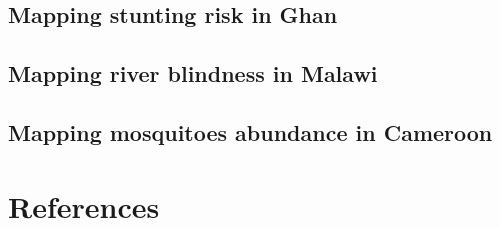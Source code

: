 \documentclass[
  letterpaper,
]{krantz}
\begin{document}
\hypertarget{mapping-stunting-risk-in-ghan}{%
\section{Mapping stunting risk in
Ghan}\label{mapping-stunting-risk-in-ghan}}

\hypertarget{mapping-river-blindness-in-malawi}{%
\section{Mapping river blindness in
Malawi}\label{mapping-river-blindness-in-malawi}}

\hypertarget{mapping-mosquitoes-abundance-in-cameroon}{%
\section{Mapping mosquitoes abundance in
Cameroon}\label{mapping-mosquitoes-abundance-in-cameroon}}


\hypertarget{references}{%
\chapter*{References}\label{references}}

\end{document}
